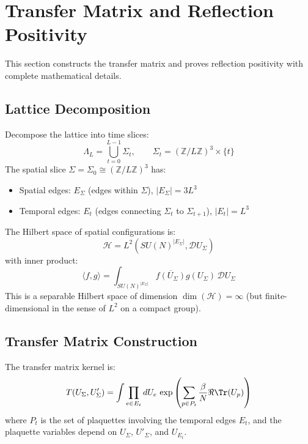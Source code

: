 \section{Transfer Matrix and Reflection Positivity}
\label{sec:transfer-rigorous}
\label{sec:transfer-matrix}

This section constructs the transfer matrix and proves reflection positivity 
with complete mathematical details.

\subsection{Lattice Decomposition}

\begin{definition}
\label{def:time-slice}
Decompose the lattice into time slices:
\[
\Lambda_L = \bigcup_{t=0}^{L-1} \Sigma_t, \qquad \Sigma_t = (\mathbb{Z}/L\mathbb{Z})^3 \times \{t\}
\]
The spatial slice $\Sigma = \Sigma_0 \cong (\mathbb{Z}/L\mathbb{Z})^3$ has:
\begin{itemize}
    \item Spatial edges: $E_\Sigma$ (edges within $\Sigma$), $|E_\Sigma| = 3L^3$
    \item Temporal edges: $E_t$ (edges connecting $\Sigma_t$ to $\Sigma_{t+1}$), $|E_t| = L^3$
\end{itemize}
\end{definition}

\begin{definition}
\label{def:hilbert-space}
The Hilbert space of spatial configurations is:
\[
\mathcal{H} = L^2(SU(N)^{|E_\Sigma|}, \mathcal{D}U_\Sigma)
\]
with inner product:
\[
\langle f, g \rangle = \int_{SU(N)^{|E_\Sigma|}} \overline{f(U_\Sigma)} g(U_\Sigma) \, \mathcal{D}U_\Sigma
\]
This is a separable Hilbert space of dimension $\dim(\mathcal{H}) = \infty$ 
(but finite-dimensional in the sense of $L^2$ on a compact group).
\end{definition}

\subsection{Transfer Matrix Construction}

\begin{definition}
\label{def:transfer-kernel}
\label{lem:explicit-kernel}
The transfer matrix kernel is:
\[
T(U_\Sigma, U'_\Sigma) = \int \prod_{e \in E_t} dU_e \, \exp\left(\sum_{p \in P_t} \frac{\beta}{N} \Re\Tr(U_p)\right)
\]
where $P_t$ is the set of plaquettes involving the temporal edges $E_t$, and the 
plaquette variables depend on $U_\Sigma$, $U'_\Sigma$, and $U_{E_t}$.
\end{definition}

